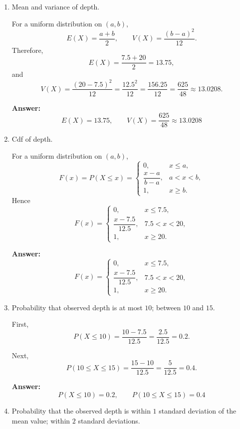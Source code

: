 \documentclass[11pt]{article}
\begin{document}
\begin{enumerate}
    \item[(a)] Mean and variance of depth.

    For a uniform distribution on \((a,b)\),
    \[
    E(X)=\frac{a+b}{2}, \qquad V(X)=\frac{(b-a)^2}{12}.
    \]
    Therefore,
    \[
    E(X)=\frac{7.5+20}{2}=13.75,
    \]
    and
    \[
    V(X)=\frac{(20-7.5)^2}{12}=\frac{12.5^2}{12}=\frac{156.25}{12}=\frac{625}{48}\approx 13.0208.
    \]

    \textbf{Answer:}
    \[
    \boxed{E(X)=13.75,\qquad V(X)=\frac{625}{48}\approx 13.0208}
    \]

    \item[(b)] Cdf of depth.

    For a uniform distribution on \((a,b)\),
    \[
    F(x)=P(X\le x)=
    \begin{cases}
    0, & x\le a,\\[4pt]
    \dfrac{x-a}{b-a}, & a<x<b,\\[8pt]
    1, & x\ge b.
    \end{cases}
    \]
    Hence
    \[
    F(x)=
    \begin{cases}
    0, & x\le 7.5,\\[6pt]
    \dfrac{x-7.5}{12.5}, & 7.5<x<20,\\[10pt]
    1, & x\ge 20.
    \end{cases}
    \]

    \textbf{Answer:}
    \[
    \boxed{
    F(x)=
    \begin{cases}
    0, & x\le 7.5,\\[4pt]
    \dfrac{x-7.5}{12.5}, & 7.5<x<20,\\[6pt]
    1, & x\ge 20.
    \end{cases}}
    \]

    \item[(c)] Probability that observed depth is at most \(10\); between \(10\) and \(15\).

    First,
    \[
    P(X\le 10)=\frac{10-7.5}{12.5}=\frac{2.5}{12.5}=0.2.
    \]

    Next,
    \[
    P(10\le X\le 15)=\frac{15-10}{12.5}=\frac{5}{12.5}=0.4.
    \]

    \textbf{Answer:}
    \[
    \boxed{P(X\le 10)=0.2,\qquad P(10\le X\le 15)=0.4}
    \]

    \item[(d)] Probability that the observed depth is within \(1\) standard deviation of the mean value; within \(2\) standard deviations.


\end{enumerate}
\end{document}

